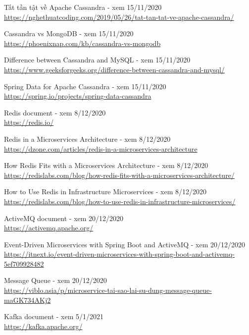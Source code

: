\documentclass[12pt,a4paper,oneside]{book}
\begin{document}
\begin{thebibliography}{80}
        \bibitem{} Tất tần tật về Apache Cassandra - xem 15/11/2020\\
        \url{https://nghethuatcoding.com/2019/05/26/tat-tan-tat-ve-apache-cassandra/}
        
        \bibitem{} Cassandra vs MongoDB - xem 15/11/2020\\
        \url{https://phoenixnap.com/kb/cassandra-vs-mongodb}
        
        \bibitem{} Difference between Cassandra and MySQL - xem 15/11/2020\\
        \url{https://www.geeksforgeeks.org/difference-between-cassandra-and-mysql/}
        
        \bibitem{} Spring Data for Apache Cassandra - xem 15/11/2020\\
        \url{https://spring.io/projects/spring-data-cassandra}
        
        \bibitem{} Redis document - xem 8/12/2020\\
        \url{https://redis.io/}
        
        \bibitem{} Redis in a Microservices Architecture - xem 8/12/2020\\
        \url{https://dzone.com/articles/redis-in-a-microservices-architecture}
        
        \bibitem{} How Redis Fits with a Microservices Architecture - xem 8/12/2020\\
        \url{https://redislabs.com/blog/how-redis-fits-with-a-microservices-architecture/}
        
        \bibitem{} How to Use Redis in Infrastructure Microservices - xem 8/12/2020\\
        \url{https://redislabs.com/blog/how-to-use-redis-in-infrastructure-microservices/}
        
        \bibitem{} ActiveMQ document - xem 20/12/2020\\
        \url{https://activemq.apache.org/}
        
        \bibitem{} Event-Driven Microservices with Spring Boot and ActiveMQ - xem 20/12/2020\\
        \url{https://itnext.io/event-driven-microservices-with-spring-boot-and-activemq-5ef709928482}
		
        \bibitem{} Message Queue - xem 20/12/2020\\
        \url{https://viblo.asia/p/microservice-tai-sao-lai-su-dung-message-queue-maGK734AKj2}
        
        \bibitem{} Kafka document - xem 5/1/2021\\
        \url{https://kafka.apache.org/}
        

\end{thebibliography}
\end{document}
